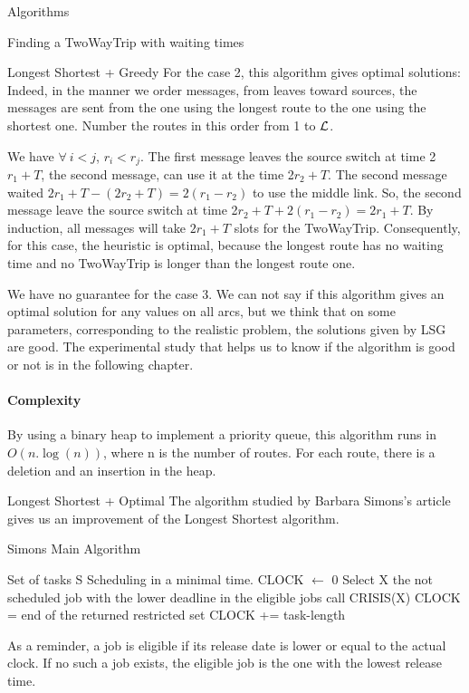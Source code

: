 \documentclass[a4paper,10pt]{report}
\begin{document}
\begin{chapter}{Algorithms}
\begin{section}{Finding a TwoWayTrip with waiting times}
\begin{subsection}{Longest Shortest + Greedy}
For the case 2, this algorithm gives optimal solutions: Indeed, in the manner we order messages, from leaves toward sources,
the messages are sent from the one using the longest route to the one using the shortest one. Number the routes in this order from 1 to ${\cal L}$.

We have $\forall \ i<j$, $r_i<r_j$.
The first message leaves the source switch at time 2$r_1+T$, the second message, can use it at the time 2$r_2+T$.
The second message waited $2r_1+T-(2r_2+T) = 2(r_1-r_2)$ to use the middle link. So, the second message leave the source switch at time
2$r_2+T + 2(r_1-r_2) = 2r_1 +T$.
By induction, all messages will take $2r_1 +T$ slots for the TwoWayTrip.
Consequently, for this case, the heuristic is optimal, because the longest route has no waiting time and no TwoWayTrip is longer than the longest route one.

We have no guarantee for the case 3. We can not say if this algorithm gives an optimal solution for any values on all arcs, but we think that on some parameters, corresponding to the realistic problem, the solutions given by LSG are good. The experimental study that helps us to know if the algorithm is good or not is in the following chapter.

\paragraph{Complexity}
By using a binary heap to implement a priority queue, this algorithm runs in $O(n.\log(n))$, 
where n is the number of routes. For each route, there is a deletion and an insertion in the heap.
\end{subsection}

\begin{subsection}{Longest Shortest + Optimal}
 The algorithm studied by Barbara Simons's article \cite{simons1978fast} gives us an improvement of the Longest Shortest algorithm.
 \begin{algorithm}[H]
\caption{Simons Main Algorithm}
\begin{algorithmic}
\REQUIRE Set of tasks S
\ENSURE Scheduling in a minimal time.
\STATE CLOCK $\leftarrow$ 0
\STATE Select X the not scheduled job with the lower deadline in the eligible jobs
\STATE call CRISIS(X)
\STATE CLOCK = end of the returned restricted set
\ELSE
\STATE CLOCK += task-length
\ENDIF

\ENDWHILE

\end{algorithmic}
\end{algorithm}
As a reminder, a job is eligible if its release date is lower or equal to the actual clock. If no such a job exists, the eligible job is the one
with the lowest release time.


\end{subsection}
\end{section}
\end{chapter}
\end{document}
